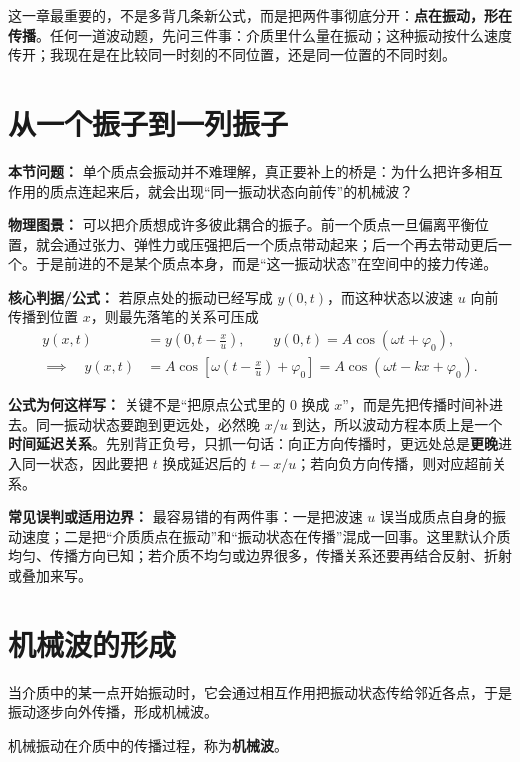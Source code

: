 \documentclass[lang=cn,11pt]{elegantbook}
\newcommand{\bridge}[1]{\begin{note}#1\end{note}}
\begin{document}
\bridge{这一章最重要的，不是多背几条新公式，而是把两件事彻底分开：\textbf{点在振动，形在传播}。任何一道波动题，先问三件事：介质里什么量在振动；这种振动按什么速度传开；我现在是在比较同一时刻的不同位置，还是同一位置的不同时刻。}

\section{从一个振子到一列振子}

\textbf{本节问题：} 单个质点会振动并不难理解，真正要补上的桥是：为什么把许多相互作用的质点连起来后，就会出现“同一振动状态向前传”的机械波？

\textbf{物理图景：} 可以把介质想成许多彼此耦合的振子。前一个质点一旦偏离平衡位置，就会通过张力、弹性力或压强把后一个质点带动起来；后一个再去带动更后一个。于是前进的不是某个质点本身，而是“这一振动状态”在空间中的接力传递。

\textbf{核心判据/公式：} 若原点处的振动已经写成 \(y(0,t)\)，而这种状态以波速 \(u\) 向前传播到位置 \(x\)，则最先落笔的关系可压成
\[
\begin{aligned}
y(x,t)&=y\!\left(0,t-\frac{x}{u}\right),\qquad
y(0,t)=A\cos(\omega t+\varphi_0),\\
\implies\quad
y(x,t)&=A\cos\left[\omega\left(t-\frac{x}{u}\right)+\varphi_0\right]
=A\cos(\omega t-kx+\varphi_0).
\end{aligned}
\]

\textbf{公式为何这样写：} 关键不是“把原点公式里的 \(0\) 换成 \(x\)”，而是先把传播时间补进去。同一振动状态要跑到更远处，必然晚 \(x/u\) 到达，所以波动方程本质上是一个\textbf{时间延迟关系}。先别背正负号，只抓一句话：向正方向传播时，更远处总是\textbf{更晚}进入同一状态，因此要把 \(t\) 换成延迟后的 \(t-x/u\)；若向负方向传播，则对应超前关系。

\textbf{常见误判或适用边界：} 最容易错的有两件事：一是把波速 \(u\) 误当成质点自身的振动速度；二是把“介质质点在振动”和“振动状态在传播”混成一回事。这里默认介质均匀、传播方向已知；若介质不均匀或边界很多，传播关系还要再结合反射、折射或叠加来写。

\section{机械波的形成}

当介质中的某一点开始振动时，它会通过相互作用把振动状态传给邻近各点，于是振动逐步向外传播，形成机械波。

\begin{definition}[机械波]\label{def:mechanical-wave}
机械振动在介质中的传播过程，称为\textbf{机械波}。
\end{definition}
\end{document}
